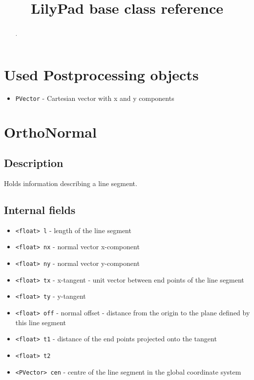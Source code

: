 \documentclass[notitlepage]{article}
\title{LilyPad base class reference}
\begin{document}
\maketitle

\begin{abstract}

.

\end{abstract}

\section{Used Postprocessing objects}

\begin{itemize}
\item \texttt{PVector} - Cartesian vector with x and y components
\end{itemize}

\section{OrthoNormal}

\subsection{Description}

Holds information describing a line segment.

\subsection{Internal fields}

\begin{itemize}
\item \texttt{<float> l} - length of the line segment
\item \texttt{<float> nx} - normal vector x-component
\item \texttt{<float> ny} - normal vector y-component
\item \texttt{<float> tx} - x-tangent - unit vector between end points of the line segment
\item \texttt{<float> ty} - y-tangent
\item \texttt{<float> off} - normal offset - distance from the origin to the plane defined by this line segment
\item \texttt{<float> t1} - distance of the end points projected onto the tangent
\item \texttt{<float> t2}
\item \texttt{<PVector> cen} - centre of the line segment in the global coordinate system
\end{itemize}
\end{document}
